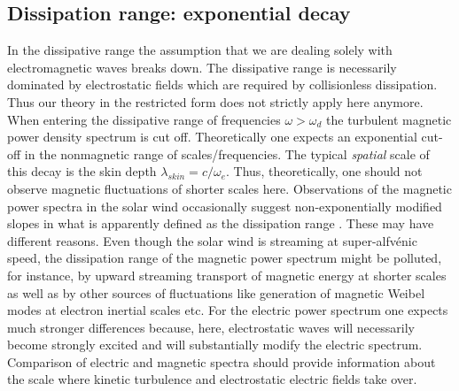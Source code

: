 \documentclass[ ]{copernicus2}
\begin{document}
{{{\subsection{Dissipation range: exponential decay}
{In the dissipative range the assumption that we are dealing solely with electromagnetic waves breaks down. The dissipative range is necessarily dominated by electrostatic fields which are required by collisionless dissipation. Thus our theory in the restricted form does not strictly apply here anymore. When entering the dissipative range of frequencies $\omega >\omega_d$ the turbulent magnetic power density spectrum is cut off. Theoretically one expects an exponential cut-off in the nonmagnetic range of scales/frequencies. The typical \emph{spatial} scale of this decay is the skin depth $\lambda_\mathit{skin}=c/ \omega_e$. Thus, theoretically, one should not observe magnetic fluctuations of shorter scales here. Observations of the magnetic power spectra in the solar wind occasionally suggest non-exponentially modified slopes in what is apparently defined as the dissipation range \citep{alexandrova2009, sahraoui2009,sahraoui2012}. These may have different reasons. Even though the solar wind is streaming at super-alfv\'enic speed, the dissipation range of the magnetic power spectrum might be polluted, for instance, by upward streaming transport of magnetic energy at shorter scales as well as by other sources of fluctuations like generation of magnetic Weibel modes at electron inertial scales etc. For the electric power spectrum one expects much stronger differences because, here, electrostatic waves will necessarily become strongly excited and will substantially modify the electric spectrum. Comparison of electric and magnetic spectra should provide information about the scale where kinetic turbulence and electrostatic electric fields take over.}

}}}
\end{document}
